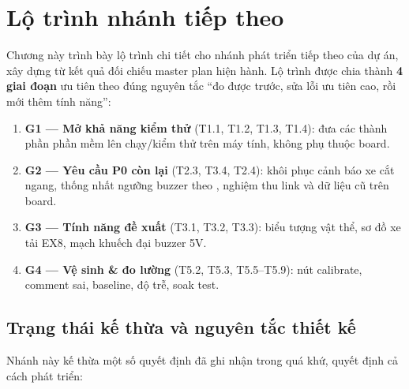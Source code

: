 
\chapter{Lộ trình nhánh tiếp theo}

Chương này trình bày lộ trình chi tiết cho nhánh phát triển tiếp theo của
dự án, xây dựng từ kết quả đối chiếu master plan hiện hành. Lộ trình được chia
thành \textbf{4 giai đoạn} ưu tiên theo đúng nguyên tắc ``đo được trước, sửa
lỗi ưu tiên cao, rồi mới thêm tính năng'':

\begin{enumerate}[label=\textbf{G\arabic*.}]
\item \textbf{G1 — Mở khả năng kiểm thử} (T1.1, T1.2, T1.3, T1.4): đưa các
thành phần phần mềm lên chạy/kiểm thử trên máy tính, không phụ thuộc board.
\item \textbf{G2 — Yêu cầu P0 còn lại} (T2.3, T3.4, T2.4): khôi phục cảnh báo
xe cắt ngang, thống nhất ngưỡng buzzer theo , nghiệm thu
link và dữ liệu cũ trên board.
\item \textbf{G3 — Tính năng đề xuất} (T3.1, T3.2, T3.3): biểu tượng vật thể,
sơ đồ xe tải EX8, mạch khuếch đại buzzer 5V.
\item \textbf{G4 — Vệ sinh \& đo lường} (T5.2, T5.3, T5.5--T5.9): nút
calibrate, comment sai, baseline, độ trễ, soak test.
\end{enumerate}

\section{Trạng thái kế thừa và nguyên tắc thiết kế}

Nhánh này kế thừa một số quyết định đã ghi nhận trong quá khứ, quyết định cả
cách phát triển:

